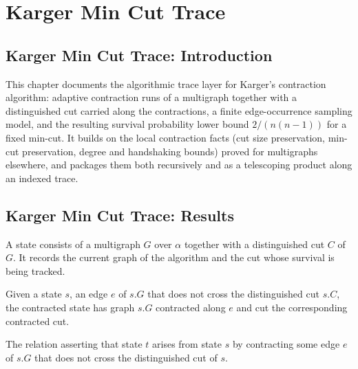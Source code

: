 \section{Karger Min Cut Trace}
\subsection*{Karger Min Cut Trace: Introduction}

This chapter documents the algorithmic trace layer for Karger's contraction algorithm:
adaptive contraction runs of a multigraph together with a distinguished cut carried along
the contractions, a finite edge-occurrence sampling model, and the resulting survival
probability lower bound $2/(n(n-1))$ for a fixed min-cut.  It builds on the local
contraction facts (cut size preservation, min-cut preservation, degree and handshaking
bounds) proved for multigraphs elsewhere, and packages them both recursively and as a
telescoping product along an indexed trace.

\subsection*{Karger Min Cut Trace: Results}

\begin{definition}
\label{KargerTrace.State}
\leanok
{}
A state consists of a multigraph $G$ over $\alpha$ together with a distinguished cut $C$
of $G$.  It records the current graph of the algorithm and the cut whose survival is
being tracked.
\end{definition}

\begin{definition}
\label{KargerTrace.contractState}
\leanok
{}
Given a state $s$, an edge $e$ of $s.G$ that does not cross the distinguished cut $s.C$,
the contracted state has graph $s.G$ contracted along $e$ and cut the corresponding
contracted cut.
\end{definition}

\begin{definition}
\label{KargerTrace.SurvivingStep}
\leanok
{}
The relation asserting that state $t$ arises from state $s$ by contracting some edge $e$
of $s.G$ that does not cross the distinguished cut of $s$.
\end{definition}

